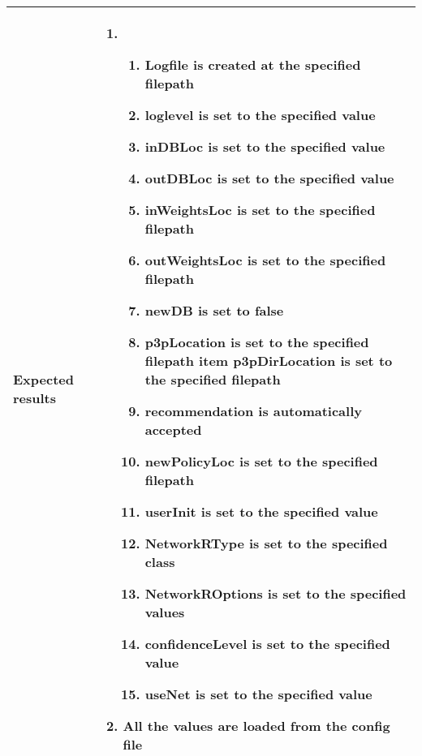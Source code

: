 \documentclass[a4paper]{article}
\begin{document}
\begin{center}
\begin{tabular}{ |  p{3cm} | p{7cm} | }
			Expected results & 	\begin{enumerate}
							\item
							\begin{enumerate}
								\item Logfile is created at the specified filepath
								\item loglevel is set to the specified value
								\item inDBLoc is set to the specified value
								\item outDBLoc is set to the specified value
								\item inWeightsLoc is set to the specified filepath
								\item outWeightsLoc is set to the specified filepath
								\item newDB is set to false
								\item p3pLocation is set to the specified filepath
								item p3pDirLocation is set to the specified filepath
								\item recommendation is automatically accepted
								\item newPolicyLoc is set to the specified filepath
								\item userInit is set to the specified value
								\item NetworkRType is set to the specified class
								\item NetworkROptions is set to the specified values
								\item confidenceLevel is set to the specified value
								\item useNet is set to the specified value
							\end{enumerate}
							\item All the values are loaded from the config file
						\end{enumerate} \\ [5pt] \hline


\end{tabular}
\end{center}
\end{document}
